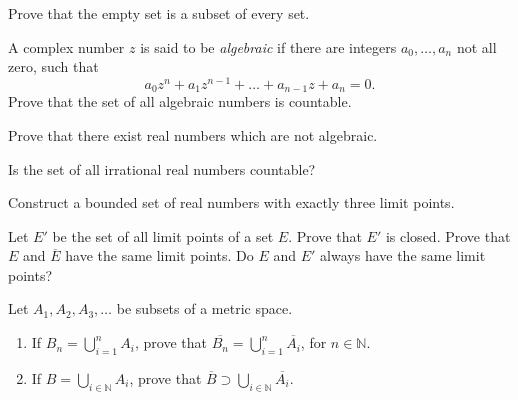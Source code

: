 \documentclass[12 pt, letterpaper]{hmcpset}
\begin{document}
\begin{problem}[1.]
	Prove that the empty set is a subset of every set.
\end{problem}

\pagebreak

\begin{problem}[2.]
	A complex number $z$ is said to be \textit{algebraic} if there are integers $a_{0}, \dots, a_{n}$ not all zero, such that
	\[
		a_{0} z^{n} + a_{1} z^{n - 1} + \dots + a_{n - 1} z + a_{n} = 0.
	\]
	Prove that the set of all algebraic numbers is countable.
\end{problem}

\pagebreak

\begin{problem}[3.]
	Prove that there exist real numbers which are not algebraic.
\end{problem}

\pagebreak

\begin{problem}[4.]
	Is the set of all irrational real numbers countable?
\end{problem}

\pagebreak

\begin{problem}[5.]
	Construct a bounded set of real numbers with exactly three limit points.
\end{problem}

\pagebreak

\begin{problem}[6.]
	Let $E'$ be the set of all limit points of a set $E$. Prove that $E'$ is closed. Prove that $E$ and $\overline{E}$ have the same limit points. Do $E$ and $E'$ always have the same limit points?
\end{problem}

\pagebreak

\begin{problem}[7.]
	Let $A_{1}, A_{2}, A_{3}, \dots$ be subsets of a metric space.
	\begin{enumerate}
		\item If $B_{n} = \bigcup_{i = 1}^{n} A_{i}$, prove that $\overline{B_{n}} = \bigcup_{i = 1}^{n} \overline{A_{i}}$, for $n \in \mathbb{N}$.
		\item If $B = \bigcup_{i \in \mathbb{N}} A_{i}$, prove that $\overline{B} \supset \bigcup_{i \in \mathbb{N}} \overline{A_{i}}$.
	\end{enumerate}
\end{problem}
\end{document}
